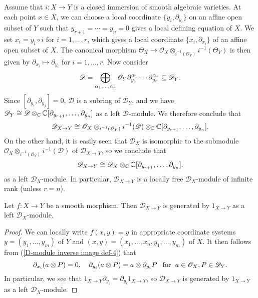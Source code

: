 \begin{example}\label{D-module closed immersion relative D-module}
Assume that $i:X\to Y$ is a closed immersion of smooth algebraic varieties. At each point $x\in X$, we can choose a local coordinate $\{y_i,\partial_{y_i}\}$ on an affine open subset of $Y$ such that $y_{r+1}=\cdots=y_n=0$ gives a local defining equation of $X$. We set $x_i=y_i\circ i$ for $i=1,\dots,r$, which gives a local coordinate $\{x_i,\partial_{x_i}\}$ of an affine open subset of $X$. The canonical morphism $\Theta_X\to\mathscr{O}_X\otimes_{i^{-1}(\mathscr{O}_Y)}i^{-1}(\Theta_Y)$ is then given by $\partial_{x_i}\mapsto\partial_{y_i}$ for $i=1,\dots,r$. Now consider
\[\mathscr{D}=\bigoplus_{\alpha_1,\dots,\alpha_r}\mathscr{O}_Y\partial_{y_1}^{\alpha_1}\cdots\partial_{y_r}^{\alpha_r}\subseteq\mathscr{D}_Y.\]
Since $[\partial_{y_i},\partial_{y_j}]=0$, $\mathscr{D}$ is a subring of $\mathscr{D}_Y$, and we have $\mathscr{D}_Y\cong\mathscr{D}\otimes_{\mathbb{C}}\mathbb{C}[\partial_{y_{r+1}},\dots,\partial_{y_n}]$ as a left $\mathscr{D}$-module. We therefore conclude that
\[\mathscr{D}_{X\to Y}\cong \mathscr{O}_X\otimes_{i^{-1}(\mathscr{O}_Y)}i^{-1}(\mathscr{D})\otimes_{\mathbb{C}}\mathbb{C}[\partial_{y_{r+1}},\dots,\partial_{y_n}].\]
On the other hand, it is easily seen that $\mathscr{D}_X$ is isomorphic to the submodule $\mathscr{O}_X\otimes_{i^{-1}(\mathscr{O}_Y)}i^{-1}(\mathscr{D})$ of $\mathscr{D}_{X\to Y}$, so we conclude that
\begin{equation}\label{D-module closed immersion relative D-module-1}
\mathscr{D}_{X\to Y}\cong\mathscr{D}_X\otimes_{\mathbb{C}}\mathbb{C}[\partial_{y_{r+1}},\dots,\partial_{y_n}].
\end{equation}
as a left $\mathscr{D}_X$-module. In particular, $\mathscr{D}_{X\to Y}$ is a locally free $\mathscr{D}_X$-module of infinite rank (unless $r=n$).
\end{example}

\begin{proposition}\label{D-module smooth morphism relative D-module}
Let $f:X\to Y$ be a smooth morphism. Then $\mathscr{D}_{X\to Y}$ is generated by $1_{X\to Y}$ as a left $\mathscr{D}_X$-module.
\end{proposition}
\begin{proof}
We can locally write $f(x,y)=y$ in appropriate coordinate systems $y=(y_1,\dots,y_m)$ of $Y$ and $(x,y)=(x_1,\dots,x_n,y_1,\dots,y_m)$ of $X$. It then follows from (\ref{D-module inverse image def-4}) that
\[\partial_{x_i}(a\otimes P)=0,\quad \partial_{y_i}(a\otimes P)=a\otimes\partial_{y_i}P\hspace{8pt}\text{for}\hspace{6pt} a\in\mathscr{O}_X,P\in\mathscr{D}_Y.\]
In particular, we see that $1_{X\to Y}\partial_{y_i}=\partial_{y_i}1_{X\to Y}$, so $\mathscr{D}_{X\to Y}$ is generated by $1_{X\to Y}$ as a left $\mathscr{D}_X$-module.
\end{proof}

